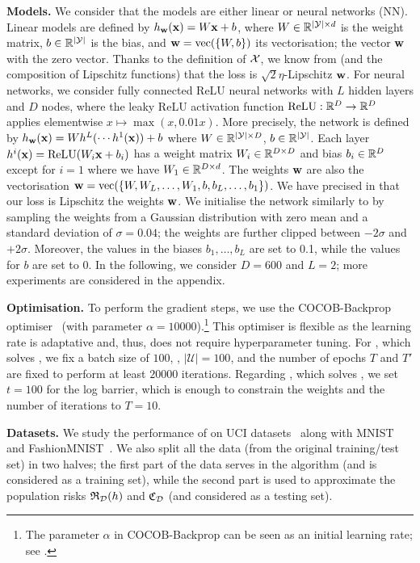 \textbf{Models.} 
We consider that the models are either linear or neural networks (NN).
Linear models are defined by $h_{\mathbf{w}}(\mathbf{x})=W\mathbf{x}+b$, where $W\in\mathbb{R}^{|\mathcal{Y}|\times d}$ is the weight matrix, $b\in\mathbb{R}^{|\mathcal{Y}|}$ is the bias, and $\mathbf{w}=\operatorname*{\mathrm{vec}}(\{W, b\})$ its vectorisation; the vector $\mathbf{w}$ with the zero vector.
Thanks to the definition of $\mathcal{X}$, we know from  (and the composition of Lipschitz functions) that the loss is $\sqrt{2}\eta$-Lipschitz \wrt $\mathbf{w}$.
For neural networks, we consider fully connected ReLU neural networks with $L$ hidden layers and $D$ nodes, where the leaky ReLU activation function $\operatorname*{\mathrm{ReLU}}: \mathbb{R}^D\to\mathbb{R}^D$ applies elementwise $x\mapsto \max(x, 0.01x)$.
More precisely, the network is defined by $h_{\mathbf{w}}(\mathbf{x}) = Wh^{L}(\cdots h^{1}(\mathbf{x}))+b$ where $W\in \mathbb{R}^{|\mathcal{Y}|\times D}$, $b\in\mathbb{R}^{|\mathcal{Y}|}$. Each layer $h^{i}(\mathbf{x})=\operatorname*{\mathrm{ReLU}}(W_i\mathbf{x}+b_i)$ has a weight matrix $W_i\in \mathbb{R}^{D\times D}$ and bias $b_i\in \mathbb{R}^{D}$ except for $i=1$ where we have $W_1\in \mathbb{R}^{D\times d}$. 
The weights $\mathbf{w}$ are also the vectorisation $\mathbf{w}=\operatorname*{\mathrm{vec}}(\{W, W_{L}, \dots, W_1, b, b_{L}, \dots, b_1\})$. 
We have precised in  that our loss is Lipschitz \wrt the weights $\mathbf{w}$.
We initialise the network similarly to \cite{dziugaite2017computing} by sampling the weights from a Gaussian distribution with zero mean and a standard deviation of $\sigma=0.04$; the weights are further clipped between $-2\sigma$ and $+2\sigma$.
Moreover, the values in the biases $b_1,\dots, b_L$ are set to 0.1, while the values for $b$ are set to $0$.
In the following, we consider $D=600$ and $L=2$; more experiments are considered in the appendix.

\textbf{Optimisation.} 
To perform the gradient steps, we use the COCOB-Backprop optimiser~\cite{orabona2017training} (with parameter $\alpha=10000$).\footnote{The parameter $\alpha$ in COCOB-Backprop can be seen as an initial learning rate; see \cite{orabona2017training}.}
This optimiser is flexible as the learning rate is adaptative and, thus, does not require hyperparameter tuning. 
For , which solves , we fix a batch size of $100$, \ie, $|\mathcal{U}|=100$, and the number of epochs $T$ and $T'$ are fixed to perform at least $20000$ iterations.
Regarding , which solves , we set $t=100$ for the log barrier, which is enough to constrain the weights and the number of iterations to $T=10$.

\textbf{Datasets.} 
We study the performance of  on UCI datasets~\citep{dua2017uci} along with MNIST~\citep{lecun1998mnist} and FashionMNIST~\citep{xiao2017fashion}.
We also split all the data (from the original training/test set) in two halves; the first part of the data serves in the algorithm (and is considered as a training set), while the second part is used to approximate the population risks $\mathfrak{R}_{\mathcal{D}}(h)$ and $\mathfrak{C}_{\mathcal{D}}$ (and considered as a testing set).

